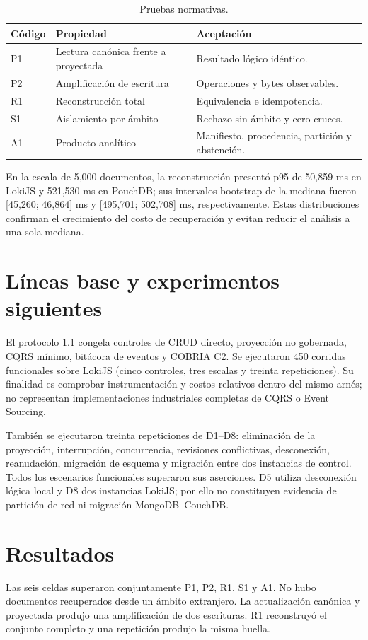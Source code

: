 \documentclass[11pt]{article}
\begin{document}
\begin{table}[h]
\centering
\caption{Pruebas normativas.}
\begin{tabularx}{\textwidth}{lXl}
\toprule Código & Propiedad & Aceptación \\ \midrule
P1 & Lectura canónica frente a proyectada & Resultado lógico idéntico.\\
P2 & Amplificación de escritura & Operaciones y bytes observables.\\
R1 & Reconstrucción total & Equivalencia e idempotencia.\\
S1 & Aislamiento por ámbito & Rechazo sin ámbito y cero cruces.\\
A1 & Producto analítico & Manifiesto, procedencia, partición y abstención.\\ \bottomrule
\end{tabularx}
\end{table}

En la escala de 5,000 documentos, la reconstrucción presentó p95 de 50,859 ms en LokiJS y 521,530 ms en PouchDB; sus intervalos bootstrap de la mediana fueron [45,260; 46,864] ms y [495,701; 502,708] ms, respectivamente. Estas distribuciones confirman el crecimiento del costo de recuperación y evitan reducir el análisis a una sola mediana.

\section{Líneas base y experimentos siguientes}
El protocolo 1.1 congela controles de CRUD directo, proyección no gobernada, CQRS mínimo, bitácora de eventos y COBRIA C2. Se ejecutaron 450 corridas funcionales sobre LokiJS (cinco controles, tres escalas y treinta repeticiones). Su finalidad es comprobar instrumentación y costos relativos dentro del mismo arnés; no representan implementaciones industriales completas de CQRS o Event Sourcing.

También se ejecutaron treinta repeticiones de D1--D8: eliminación de la proyección, interrupción, concurrencia, revisiones conflictivas, desconexión, reanudación, migración de esquema y migración entre dos instancias de control. Todos los escenarios funcionales superaron sus aserciones. D5 utiliza desconexión lógica local y D8 dos instancias LokiJS; por ello no constituyen evidencia de partición de red ni migración MongoDB--CouchDB.

\section{Resultados}
Las seis celdas superaron conjuntamente P1, P2, R1, S1 y A1. No hubo documentos recuperados desde un ámbito extranjero. La actualización canónica y proyectada produjo una amplificación de dos escrituras. R1 reconstruyó el conjunto completo y una repetición produjo la misma huella.
\end{document}
